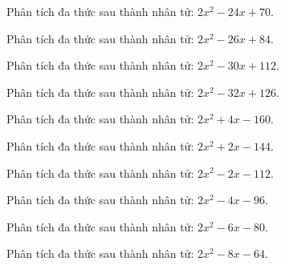 \begin{bt}
	Phân tích đa thức sau thành nhân tử: $2 x^2 - 24 x + 70$.
\end{bt}
\begin{bt}
	Phân tích đa thức sau thành nhân tử: $2 x^2 - 26 x + 84$.
\end{bt}
\begin{bt}
	Phân tích đa thức sau thành nhân tử: $2 x^2 - 30 x + 112$.
\end{bt}
\begin{bt}
	Phân tích đa thức sau thành nhân tử: $2 x^2 - 32 x + 126$.
\end{bt}
\begin{bt}
	Phân tích đa thức sau thành nhân tử: $2 x^2 + 4 x - 160$.
\end{bt}
\begin{bt}
	Phân tích đa thức sau thành nhân tử: $2 x^2 + 2 x - 144$.
\end{bt}
\begin{bt}
	Phân tích đa thức sau thành nhân tử: $2 x^2 - 2 x - 112$.
\end{bt}
\begin{bt}
	Phân tích đa thức sau thành nhân tử: $2 x^2 - 4 x - 96$.
\end{bt}
\begin{bt}
	Phân tích đa thức sau thành nhân tử: $2 x^2 - 6 x - 80$.
\end{bt}
\begin{bt}
	Phân tích đa thức sau thành nhân tử: $2 x^2 - 8 x - 64$.
\end{bt}

